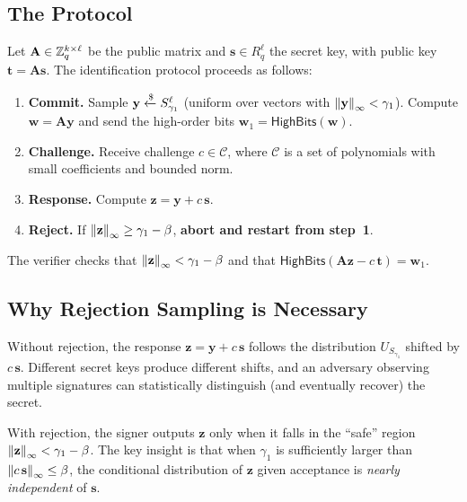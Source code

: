 \subsection{The Protocol}
\label{subsec:fs-aborts-protocol}

Let $\mathbf{A} \in \mathbb{Z}_q^{k \times \ell}$ be the public matrix and $\mathbf{s} \in R_q^{\ell}$ the secret key, with public key $\mathbf{t} = \mathbf{A}\mathbf{s}$.  The identification protocol proceeds as follows:

\begin{enumerate}
\item \textbf{Commit.}  Sample $\mathbf{y} \getsr S_{\gamma_1}^{\ell}$ (uniform over vectors with $\left\lVert \mathbf{y} \right\rVert_\infty < \gamma_1$).  Compute $\mathbf{w} = \mathbf{A}\mathbf{y}$ and send the high-order bits $\mathbf{w}_1 = \mathsf{HighBits}(\mathbf{w})$.
\item \textbf{Challenge.}  Receive challenge $c \in \mathcal{C}$, where $\mathcal{C}$ is a set of polynomials with small coefficients and bounded norm.
\item \textbf{Response.}  Compute $\mathbf{z} = \mathbf{y} + c\,\mathbf{s}$.
\item \textbf{Reject.}  If $\left\lVert \mathbf{z} \right\rVert_\infty \geq \gamma_1 - \beta$, \textbf{abort and restart from step~1}.
\end{enumerate}

\noindent The verifier checks that $\left\lVert \mathbf{z} \right\rVert_\infty < \gamma_1 - \beta$ and that $\mathsf{HighBits}(\mathbf{A}\mathbf{z} - c\,\mathbf{t}) = \mathbf{w}_1$.

\subsection{Why Rejection Sampling is Necessary}
\label{subsec:rejection-necessity}

Without rejection, the response $\mathbf{z} = \mathbf{y} + c\,\mathbf{s}$ follows the distribution $U_{S_{\gamma_1}}$ shifted by $c\,\mathbf{s}$.  Different secret keys produce different shifts, and an adversary observing multiple signatures can statistically distinguish (and eventually recover) the secret.

With rejection, the signer outputs $\mathbf{z}$ only when it falls in the ``safe'' region $\left\lVert \mathbf{z} \right\rVert_\infty < \gamma_1 - \beta$.  The key insight is that when $\gamma_1$ is sufficiently larger than $\left\lVert c\,\mathbf{s} \right\rVert_\infty \leq \beta$, the conditional distribution of $\mathbf{z}$ given acceptance is \emph{nearly independent} of $\mathbf{s}$.

